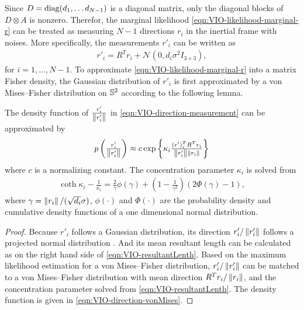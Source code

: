 Since $D = \mathrm{diag}(d_1,\ldots d_{N-1})$ is a diagonal matrix, only the diagonal blocks of $D\otimes A$ is nonzero.
Therefor, the marginal likelihood \eqref{eqn:VIO-likelihood-marginal-r} can be treated as measuring $N-1$ directions $r_i$ in the inertial frame with noises.
More specifically, the measurements $r'_i$ can be written as
\begin{align} \label{eqn:VIO-direction-measurement}
	r'_i = R^Tr_i + \mathcal{N}(0, d_i\sigma^2 I_{3\times 3}),
\end{align}
for $i = 1,\ldots,N-1$.
To approximate \eqref{eqn:VIO-likelihood-marginal-r} into a matrix Fisher density, the Gaussian distribution of $r'_i$ is first approximated by a von Mises--Fisher distribution on $\mathbb{S}^2$ according to the following lemma.

\begin{lemma} \label{thm:VIO-GaussToVM}
	The density function of $\tfrac{r'_i}{\left\| r'_i \right\|}$ in \eqref{eqn:VIO-direction-measurement} can be approximated by
	\begin{align} \label{eqn:VIO-direction-vonMises}
		p\left( \tfrac{r'_i}{\left\| r'_i \right\|} \right) \approx c \exp\left\{ \kappa_i \tfrac{(r')_i^TR^Tr_i}{\left\| r'_i \right\|\left\| r_i \right\|} \right\}
	\end{align}
	where $c$ is a normalizing constant. The concentration parameter $\kappa_i$ is solved from
	\begin{align} \label{eqn:VIO-resultantLenth}
		\coth\kappa_i - \frac{1}{\kappa_i} = \frac{2}{\gamma} \phi(\gamma) + \left( 1-\frac{1}{\gamma^2} \right) (2\Phi(\gamma)-1),
	\end{align}
	where $\gamma = \left\| r_i \right\|/(\sqrt{d_i}\sigma)$, $\phi(\cdot)$ and $\Phi(\cdot)$ are the probability density and cumulative density functions of a one dimensional normal distribution.
\end{lemma}
\begin{proof}
	Because $r'_i$ follows a Gaussian distribution, its direction $r'_i/\left\| r'_i \right\|$ follows a projected normal distribution \cite{mardia2009directional}.
	And its mean resultant length \cite{presnell2008mean} can be calculated as on the right hand side of \eqref{eqn:VIO-resultantLenth}.
	Based on the maximum likelihood estimation \cite{mardia2009directional} for a von Mises--Fisher distribution, $r'_i/\left\| r'_i \right\|$ can be matched to a von Mises--Fisher distribution with mean direction $R^Tr_i/\left\| r_i \right\|$, and the concentration parameter solved from \eqref{eqn:VIO-resultantLenth}.
	The density function is given in \eqref{eqn:VIO-direction-vonMises}.
\end{proof}

